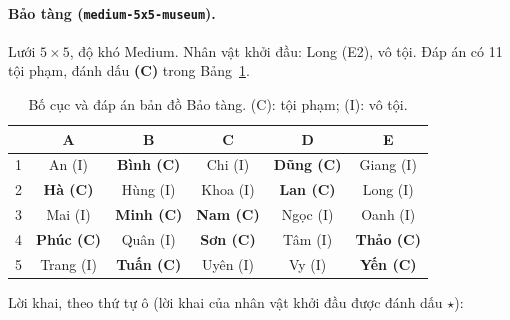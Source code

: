 \paragraph{Bảo tàng (\texttt{medium-5x5-museum}).}
Lưới $5\times5$, độ khó Medium. Nhân vật khởi đầu: Long (E2), vô tội. Đáp án có 11 tội phạm, đánh dấu \textbf{(C)} trong Bảng~\ref{tab:map_museum}.
\begin{table}[htbp]
  \centering\small
  \caption{Bố cục và đáp án bản đồ Bảo tàng. (C): tội phạm; (I): vô tội.}
  \label{tab:map_museum}
  \begin{tabular}{cccccc}
    \toprule
    & A & B & C & D & E \\
    \midrule
    1 & An (I) & \textbf{Bình (C)} & Chi (I) & \textbf{Dũng (C)} & Giang (I) \\
    2 & \textbf{Hà (C)} & Hùng (I) & Khoa (I) & \textbf{Lan (C)} & Long (I) \\
    3 & Mai (I) & \textbf{Minh (C)} & \textbf{Nam (C)} & Ngọc (I) & Oanh (I) \\
    4 & \textbf{Phúc (C)} & Quân (I) & \textbf{Sơn (C)} & Tâm (I) & \textbf{Thảo (C)} \\
    5 & Trang (I) & \textbf{Tuấn (C)} & Uyên (I) & Vy (I) & \textbf{Yến (C)} \\
    \bottomrule
  \end{tabular}
\end{table}
\noindent Lời khai, theo thứ tự ô (lời khai của nhân vật khởi đầu được đánh dấu $\star$):
